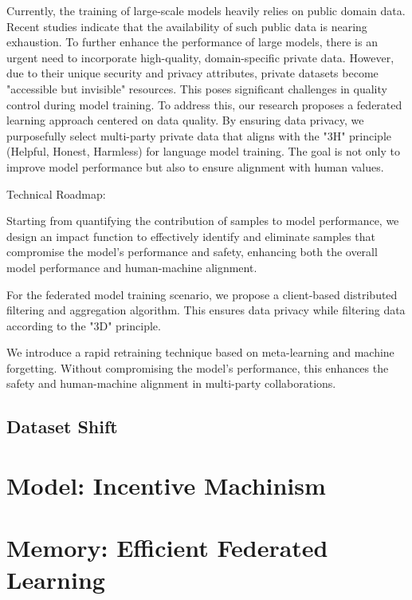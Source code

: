 \documentclass[withindex,glossary]{cam-thesis}
\begin{document}
Currently, the training of large-scale models heavily relies on public domain data. Recent studies indicate that the availability of such public data is nearing exhaustion. To further enhance the performance of large models, there is an urgent need to incorporate high-quality, domain-specific private data. However, due to their unique security and privacy attributes, private datasets become "accessible but invisible" resources. This poses significant challenges in quality control during model training. To address this, our research proposes a federated learning approach centered on data quality. By ensuring data privacy, we purposefully select multi-party private data that aligns with the "3H" principle (Helpful, Honest, Harmless) for language model training. The goal is not only to improve model performance but also to ensure alignment with human values.

Technical Roadmap:

Starting from quantifying the contribution of samples to model performance, we design an impact function to effectively identify and eliminate samples that compromise the model's performance and safety, enhancing both the overall model performance and human-machine alignment.

For the federated model training scenario, we propose a client-based distributed filtering and aggregation algorithm. This ensures data privacy while filtering data according to the "3D" principle.

We introduce a rapid retraining technique based on meta-learning and machine forgetting. Without compromising the model's performance, this enhances the safety and human-machine alignment in multi-party collaborations.


\subsection{Dataset Shift} 


\section{Model: Incentive Machinism}

\section{Memory: Efficient Federated Learning}
\end{document}
